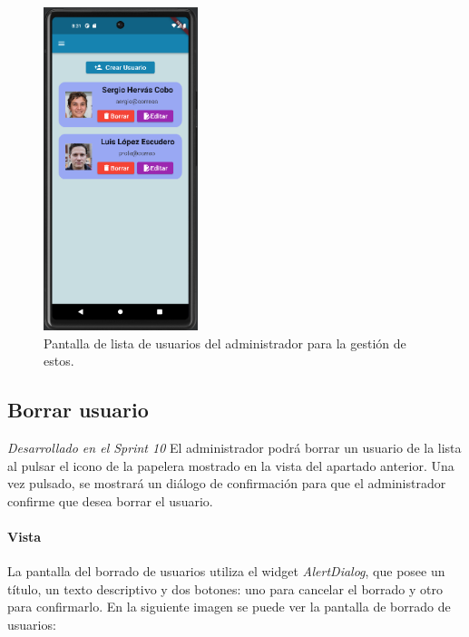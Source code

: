 \begin{figure}[H]
  \centering
  \includegraphics[width=0.4\textwidth]{imagenes/c7/listausuarios.png}
  \caption{Pantalla de lista de usuarios del administrador para la gestión de estos.} 
  \label{fig:listausuarios}
\end{figure}

\subsection{Borrar usuario} 

\textit{Desarrollado en el Sprint 10}
El administrador podrá borrar un usuario de la lista al pulsar el icono de la papelera mostrado en la vista del apartado anterior. Una vez pulsado, se mostrará un diálogo de confirmación para que el administrador confirme que desea borrar el usuario.

\paragraph*{Vista}
La pantalla del borrado de usuarios utiliza el widget \textit{AlertDialog}, que posee
un título, un texto descriptivo y dos botones: uno para cancelar el borrado y otro para confirmarlo.
En la siguiente imagen se puede ver la pantalla de borrado de usuarios:


